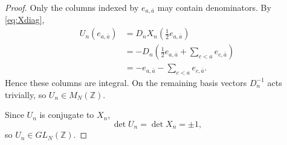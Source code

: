 \documentclass[10pt,a4paper]{amsart}
\newcommand{\ZZ}{\mathbb Z}
\begin{document}
\begin{proof}
Only the columns indexed by $e_{a,\bar a}$ may contain denominators. By \eqref{eq:Xdiag},
\[
 \begin{split}
 U_n(e_{a,\bar a})
 &=D_nX_n\left(\frac12e_{a,\bar a}\right)\\
 &=-D_n\left(\frac12e_{a,\bar a}+\sum_{c<a}e_{c,\bar a}\right)\\
 &=-e_{a,\bar a}-\sum_{c<a}e_{c,\bar a}.
 \end{split}
\]
Hence these columns are integral. On the remaining basis vectors $D_n^{-1}$ acts trivially, so $U_n\in M_N(\ZZ)$.

Since $U_n$ is conjugate to $X_n$,
\[
                 \det U_n=\det X_n=\pm1,
\]
so $U_n\in GL_N(\ZZ)$.
\end{proof}
\end{document}
